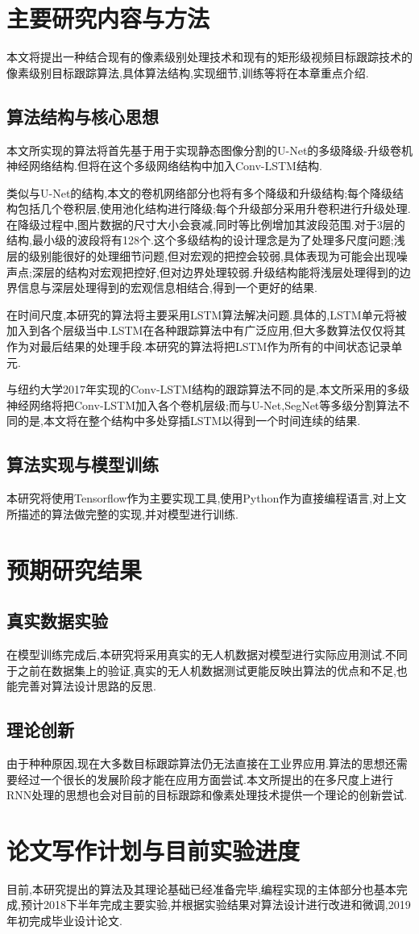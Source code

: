 
\chapter{主要研究内容与方法}
本文将提出一种结合现有的像素级别处理技术和现有的矩形级视频目标跟踪技术的像素级别目标跟踪算法,具体算法结构,实现细节,训练等将在本章重点介绍.
\section{算法结构与核心思想}
本文所实现的算法将首先基于用于实现静态图像分割的U-Net\supercite{ronneberger2015u}的多级降级-升级卷机神经网络结构.但将在这个多级网络结构中加入Conv-LSTM结构.
\par
类似与U-Net的结构,本文的卷机网络部分也将有多个降级和升级结构;每个降级结构包括几个卷积层,使用池化结构进行降级;每个升级部分采用升卷积进行升级处理.在降级过程中,图片数据的尺寸大小会衰减,同时等比例增加其波段范围.对于3层的结构,最小级的波段将有128个.这个多级结构的设计理念是为了处理多尺度问题;浅层的级别能很好的处理细节问题,但对宏观的把控会较弱,具体表现为可能会出现噪声点;深层的结构对宏观把控好,但对边界处理较弱.升级结构能将浅层处理得到的边界信息与深层处理得到的宏观信息相结合,得到一个更好的结果.
\par
在时间尺度,本研究的算法将主要采用LSTM算法解决问题.具体的,LSTM单元将被加入到各个层级当中.LSTM在各种跟踪算法中有广泛应用,但大多数算法仅仅将其作为对最后结果的处理手段.本研究的算法将把LSTM作为所有的中间状态记录单元.
\par
与纽约大学2017年实现的Conv-LSTM结构的跟踪算法不同的是,本文所采用的多级神经网络将把Conv-LSTM加入各个卷机层级;而与U-Net,SegNet等多级分割算法不同的是,本文将在整个结构中多处穿插LSTM以得到一个时间连续的结果.
\section{算法实现与模型训练}
本研究将使用Tensorflow作为主要实现工具,使用Python作为直接编程语言,对上文所描述的算法做完整的实现,并对模型进行训练.

\chapter{预期研究结果}
\section{真实数据实验}
在模型训练完成后,本研究将采用真实的无人机数据对模型进行实际应用测试.不同于之前在数据集上的验证,真实的无人机数据测试更能反映出算法的优点和不足,也能完善对算法设计思路的反思.
\section{理论创新}
由于种种原因,现在大多数目标跟踪算法仍无法直接在工业界应用.算法的思想还需要经过一个很长的发展阶段才能在应用方面尝试.本文所提出的在多尺度上进行RNN处理的思想也会对目前的目标跟踪和像素处理技术提供一个理论的创新尝试.

\chapter{论文写作计划与目前实验进度}
目前,本研究提出的算法及其理论基础已经准备完毕,编程实现的主体部分也基本完成,预计2018下半年完成主要实验,并根据实验结果对算法设计进行改进和微调,2019年初完成毕业设计论文.
